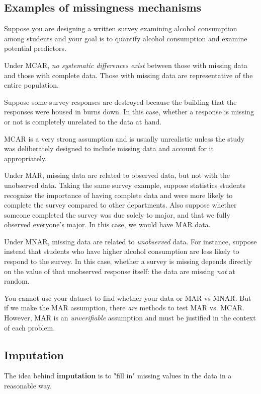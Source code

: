 \documentclass[titlepage, 12pt, leqno]{article}
\begin{document}
\subsection{Examples of missingness mechanisms}
Suppose you are designing a written survey examining alcohol consumption among
students and your goal is to quantify alcohol consumption and examine potential
predictors.

Under MCAR, \textit{no systematic differences exist} between those with missing
data and those with complete data. Those with missing data are representative of
the entire population.

Suppose some survey responses are destroyed because the building that the 
responses were housed in burns down. In this case, whether a response is missing
or not is completely unrelated to the data at hand.

\begin{note}
    MCAR is a very strong assumption and is usually unrealistic unless the study 
    was deliberately designed to include missing data and account for it
    appropriately.
\end{note}

Under MAR, missing data are related to observed data, but not with the unobserved
data. Taking the same survey example, suppose statistics students recognize the
importance of having complete data and were more likely to complete the survey
compared to other departments. Also suppose whether someone completed the survey
was due solely to major, and that we fully observed everyone's major. In this
case, we would have MAR data.

Under MNAR, missing data are related to \textit{unobserved} data. For instance,
suppose instead that students who have higher alcohol consumption are less likely
to respond to the survey. In this case, whether a survey is missing depends 
directly on the value of that unobserved response itself: the data are missing
\textit{not} at random.

\begin{note}
    You cannot use your dataset to find whether your data or MAR vs MNAR. But if
    we make the MAR assumption, there \textit{are} methods to test MAR vs. MCAR.
    However, MAR is an \textit{unverifiable} assumption and must be justified in
    the context of each problem.
\end{note}

\subsection{Imputation}
\begin{definition}
    The idea behind \textbf{imputation} is to "fill in" missing values in the 
    data in a reasonable way.
\end{definition}
\end{document}
